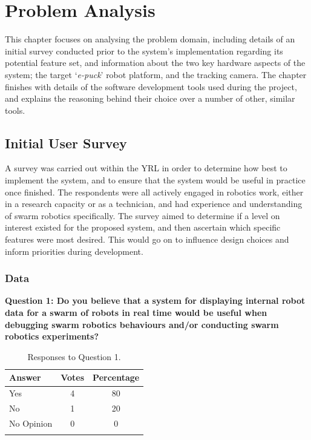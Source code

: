 \chapter[Problem Analysis]{Problem Analysis} %

\label{ChapterProblemAnalysis} %

This chapter focuses on analysing the problem domain, including details of an initial survey conducted prior to the system's implementation regarding its potential feature set, and information about the two key hardware aspects of the system; the target `\textit{e-puck}' robot platform, and the tracking camera. The chapter finishes with details of the software development tools used during the project, and explains the reasoning behind their choice over a number of other, similar tools.


\section{Initial User Survey} \label{InitialUserSurvey}

A survey was carried out within the YRL in order to determine how best to implement the system, and to ensure that the system would be useful in practice once finished. The respondents were all actively engaged in robotics work, either in a research capacity or as a technician, and had experience and understanding of swarm robotics specifically. The survey aimed to determine if a level on interest existed for the proposed system, and then ascertain which specific features were most desired. This would go on to influence design choices and inform priorities during development.


\subsection{Data}
\noindent\textbf{Question 1: Do you believe that a system for displaying internal robot data for a swarm of robots in real time would be useful when debugging swarm robotics behaviours and/or conducting swarm robotics experiments?}

\begin{longtable}{ l c c }
 \textbf{Answer} & \textbf{Votes} & \textbf{Percentage} \\ 
 \hline
 Yes & 4 & 80 \\ 
 No & 1 & 20 \\
 No Opinion & 0 & 0 \\
 \bottomrule
 \caption{Responses to Question 1.}
 \label{tab:QuestionOneData}
\end{longtable}

